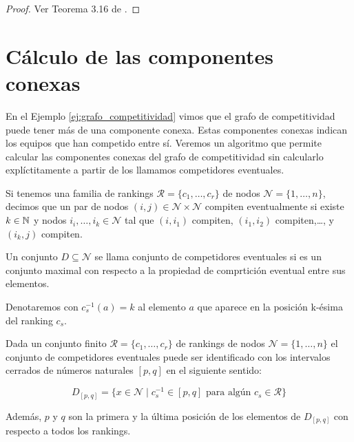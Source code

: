 \begin{proof}
Ver Teorema 3.16 de \cite{journals/corr/CriadoGPR13a}.
\end{proof}


\section{Cálculo de las componentes conexas}

En el Ejemplo \ref{ej:grafo_competitividad} vimos que el grafo de competitividad puede tener más de una componente conexa. Estas componentes conexas indican los equipos que han competido entre sí. Veremos un algoritmo que permite calcular las componentes conexas del grafo de competitividad sin calcularlo explíctitamente a partir de los llamamos competidores eventuales.

\begin{defi}
Si tenemos una familia de rankings $\mathcal{R} = \{c_1,\dots,c_r\}$ de nodos $\mathcal{N} = \{1,\dots,n\}$, decimos que un par de nodos $(i,j) \in \mathcal{N} \times \mathcal{N}$ compiten eventualmente si existe $k \in \mathbb{N}$ y nodos $i_i,\dots,i_k \in \mathcal{N}$ tal que $(i,i_1)$ compiten, $(i_1,i_2)$ compiten,\dots, y $(i_k,j)$ compiten. 
\end{defi}

\begin{defi}
Un conjunto $D \subseteq \mathcal{N}$ se llama conjunto de competidores eventuales si es un conjunto maximal con respecto a la propiedad de comprtición eventual entre sus elementos.
\end{defi}

Denotaremos con $c_s^{-1}(a) = k$ al elemento $a$ que aparece en la posición k-ésima del ranking $c_s$.

\begin{teo}
Dada un conjunto finito $\mathcal{R} = \{ c_1, \dots, c_r \}$ de rankings de nodos $\mathcal{N} = \{1,\dots, n\}$ el conjunto de competidores eventuales puede ser identificado con los intervalos cerrados de números naturales $[p,q]$ en el siguiente sentido:

\begin{equation*}
D_{[p,q]} = \{ x \in \mathcal{N} \mid c_s^{-1} \in [p,q] \text{ para algún } c_s \in \mathcal{R} \}
\end{equation*}

Además, $p$ y $q$ son la primera y la última posición de los elementos de $D_{[p,q]}$ con respecto a todos los rankings.
\end{teo} 

